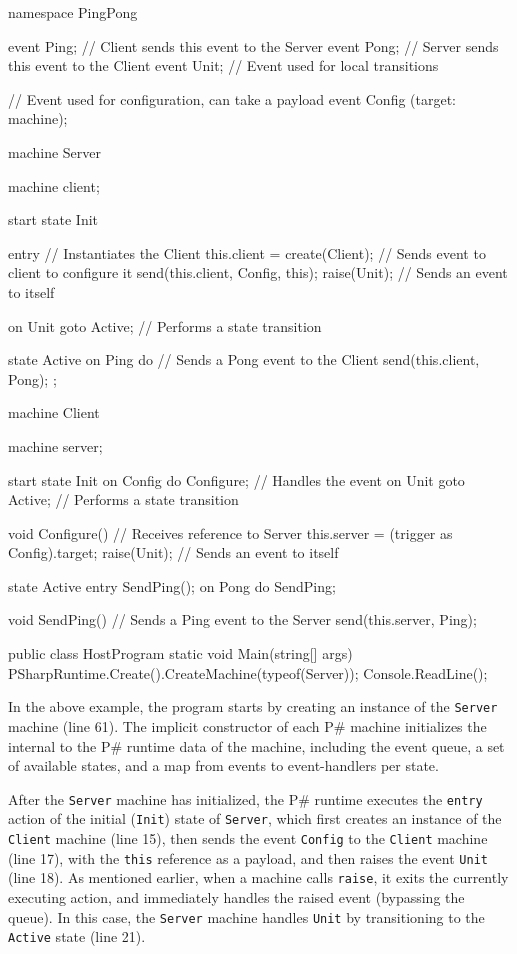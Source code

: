 \documentclass{llncs}
\newcommand{\ps}{P\#\xspace}
\begin{document}
\begin{psharp}
namespace PingPong {
  event Ping; // Client sends this event to the Server
  event Pong; // Server sends this event to the Client
  event Unit; // Event used for local transitions
  
  // Event used for configuration, can take a payload
  event Config (target: machine);
  
  machine Server {
    machine client;
  
    start state Init {
      entry {
        // Instantiates the Client
        this.client = create(Client);
        // Sends event to client to configure it
        send(this.client, Config, this);
        raise(Unit); // Sends an event to itself
      }
      
      on Unit goto Active; // Performs a state transition
    }
  
    state Active {
      on Ping do {
        // Sends a Pong event to the Client
        send(this.client, Pong);
      };
    }
  }
  
  machine Client {
    machine server;
  
    start state Init {
      on Config do Configure; // Handles the event
      on Unit goto Active; // Performs a state transition
    }
    
    void Configure() {
      // Receives reference to Server
      this.server = (trigger as Config).target;
      raise(Unit); // Sends an event to itself
    }
  
    state Active {
      entry {
        SendPing();
      }
      on Pong do SendPing;
    }
  
    void SendPing() {
      // Sends a Ping event to the Server
      send(this.server, Ping);
    }
  }
  
  public class HostProgram {
    static void Main(string[] args) {
      PSharpRuntime.Create().CreateMachine(typeof(Server));
      Console.ReadLine();
    }
  }
}
\end{psharp}

\noindent
In the above example, the program starts by creating an instance of the \texttt{Server} machine (line 61). The implicit constructor of each \ps machine initializes the internal to the \ps runtime data of the machine, including the event queue, a set of available states, and a map from events to event-handlers per state.

After the \texttt{Server} machine has initialized, the \ps runtime executes the \texttt{entry} action of the initial (\texttt{Init}) state of \texttt{Server}, which first creates an instance of the \texttt{Client} machine (line 15), then sends the event \texttt{Config} to the \texttt{Client} machine (line 17), with the \texttt{this} reference as a payload, and then raises the event \texttt{Unit} (line 18). As mentioned earlier, when a machine calls \texttt{raise}, it exits the currently executing action, and immediately handles the raised event (bypassing the queue). In this case, the \texttt{Server} machine handles \texttt{Unit} by transitioning to the \texttt{Active} state (line 21).
\end{document}

